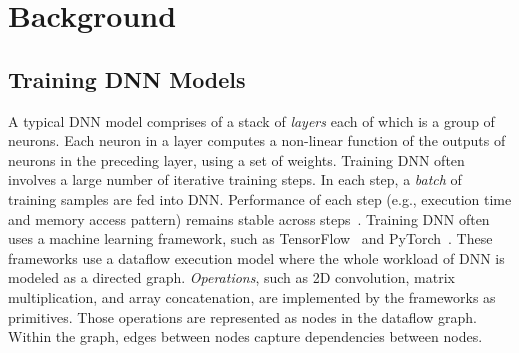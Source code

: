 \vspace{-5pt}
\section{Background}
\label{sec:bg}

\vspace{-2pt}
\subsection{Training DNN Models}
\vspace{-1pt}
\label{sec:bg_training}

A typical DNN model comprises of a stack of \textit{layers} each of which is a group of neurons. Each neuron in a layer computes a non-linear function of the outputs of neurons in the preceding layer, using a set of weights. Training DNN often involves a large number of iterative training steps. In each step, a \textit{batch} of training samples are fed into DNN. Performance of each step (e.g., execution time and memory access pattern) remains stable across steps~\cite{liu:micro18,ipdps19_liu,DBLP:conf/asplos/SivathanuCSZ19}. %
Training DNN often uses a machine learning framework, such as TensorFlow~\cite{tensorflow2015-whitepaper} and  PyTorch~\cite{pytorch}. %
These frameworks use a dataflow execution model where the whole workload of DNN is modeled as a directed graph. 
\textit{Operations}, such as 2D convolution, matrix multiplication, and array concatenation, are implemented by the frameworks as primitives. Those operations are represented as nodes in the dataflow graph. Within the graph, edges between nodes capture dependencies between nodes. 


